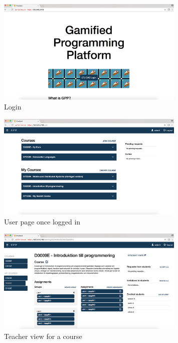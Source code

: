 \begin{figure}[H]
\centering
\includegraphics[width=0.8\textwidth]{img/gppinpictures/login2.png}
\caption{Login}
\label{fig:login}
\end{figure}

\begin{figure}[H]
\centering
\includegraphics[width=0.8\textwidth]{img/gppinpictures/user.png}
\caption{User page once logged in}
\label{fig:user}
\end{figure}

\begin{figure}[H]
\centering
\includegraphics[width=0.8\textwidth]{img/gppinpictures/teacher.png}
\caption{Teacher view for a course}
\label{fig:teacher}
\end{figure}

